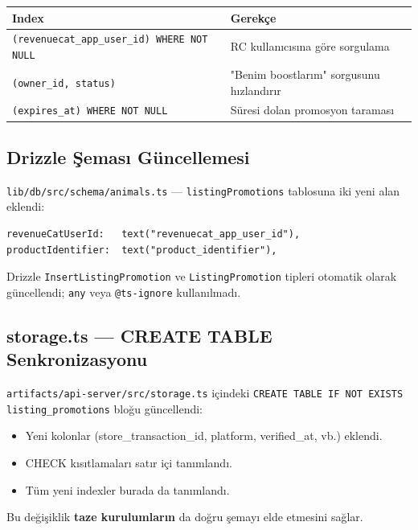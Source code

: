 \documentclass[12pt,a4paper]{article}
\begin{document}
\begin{center}
\begin{tabular}{ll}
  \toprule
  \textbf{Index} & \textbf{Gerekçe}\\
  \midrule
  \texttt{(revenuecat\_app\_user\_id) WHERE NOT NULL} & RC kullanıcısına göre sorgulama\\
  \texttt{(owner\_id, status)} & "Benim boostlarım" sorgusunu hızlandırır\\
  \texttt{(expires\_at) WHERE NOT NULL} & Süresi dolan promosyon taraması\\
  \bottomrule
\end{tabular}
\end{center}

\subsection{Drizzle Şeması Güncellemesi}

\texttt{lib/db/src/schema/animals.ts} — \texttt{listingPromotions} tablosuna iki yeni alan eklendi:

\begin{lstlisting}[language={}]
revenueCatUserId:   text("revenuecat_app_user_id"),
productIdentifier:  text("product_identifier"),
\end{lstlisting}

Drizzle \texttt{InsertListingPromotion} ve \texttt{ListingPromotion} tipleri
otomatik olarak güncellendi; \texttt{any} veya \texttt{@ts-ignore} kullanılmadı.

\subsection{storage.ts — CREATE TABLE Senkronizasyonu}

\texttt{artifacts/api-server/src/storage.ts} içindeki
\texttt{CREATE TABLE IF NOT EXISTS listing\_promotions} bloğu güncellendi:

\begin{itemize}[leftmargin=1.5em]
  \item Yeni kolonlar (store\_transaction\_id, platform, verified\_at, vb.) eklendi.
  \item CHECK kısıtlamaları satır içi tanımlandı.
  \item Tüm yeni indexler burada da tanımlandı.
\end{itemize}

Bu değişiklik \textbf{taze kurulumların} da doğru şemayı elde etmesini sağlar.
\end{document}
